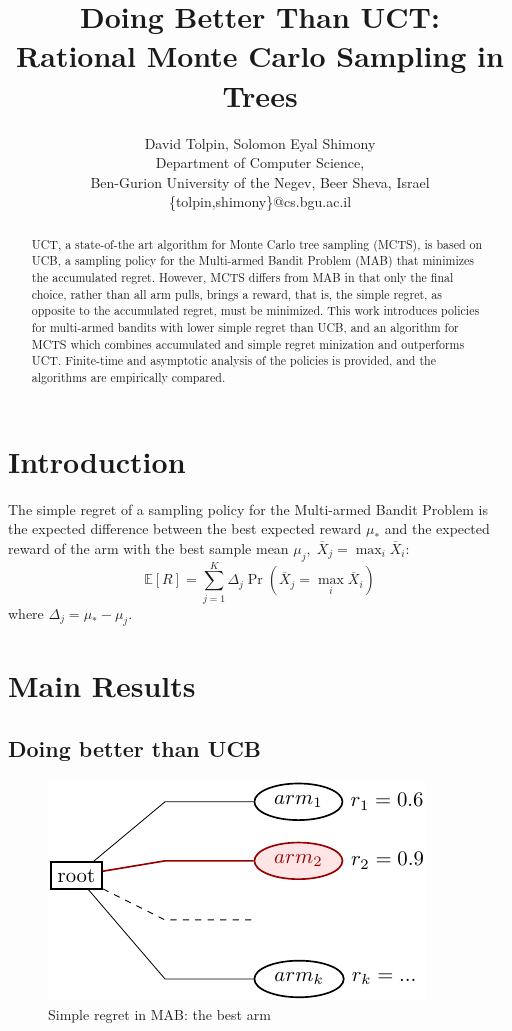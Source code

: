 \documentclass{article}
\title{Doing Better Than UCT: \\ Rational Monte Carlo Sampling in Trees}
\author {David Tolpin, Solomon Eyal Shimony \\
Department of Computer Science, \\
Ben-Gurion University of the Negev, Beer Sheva, Israel \\
\{tolpin,shimony\}@cs.bgu.ac.il}
\newcommand {\IE} {\ensuremath {\mathbb{E}}}
\begin{document}
\maketitle

\begin{abstract}
UCT, a state-of-the art algorithm for Monte Carlo tree sampling
(MCTS), is based on UCB, a sampling policy for the Multi-armed Bandit
Problem (MAB) that minimizes the accumulated regret. However, MCTS
differs from MAB in that only the final choice, rather than all arm
pulls, brings a reward, that is, the simple regret, as opposite to the
accumulated regret, must be minimized. This work introduces policies for
multi-armed bandits with lower simple regret than UCB, and an
algorithm for MCTS which combines accumulated and simple regret
minization and outperforms UCT. Finite-time and asymptotic analysis of
the policies is provided, and the algorithms are empirically compared.
\end{abstract}


\section{Introduction}

The simple regret of a sampling policy for the Multi-armed Bandit
Problem is the expected difference between the best expected reward
$\mu_*$ and the expected reward of the arm with the best sample mean
$\mu_j,\;\overline X_j=\max_i\overline X_i$:
\begin{equation}
\label{eq:simple-regret}
\IE[R]=\sum_{j=1}^K\Delta_j\Pr(\overline X_j=\max_i\overline X_i)
\end{equation}
where $\Delta_j=\mu_*-\mu_j$.

\section{Main Results}

\subsection{Doing better than UCB}

\begin{figure}[t]
  \centering
  \includegraphics[scale=1.2]{onelevel-tree.pdf}
  \caption{Simple regret in MAB: the best arm}
  \label{fig:onelevel-tree}
\end{figure}
\end{document}

